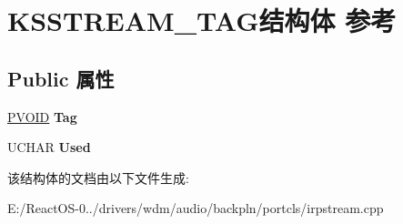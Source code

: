 \hypertarget{struct_k_s_s_t_r_e_a_m___t_a_g}{}\section{K\+S\+S\+T\+R\+E\+A\+M\+\_\+\+T\+A\+G结构体 参考}
\label{struct_k_s_s_t_r_e_a_m___t_a_g}
\subsection*{Public 属性}
\begin{DoxyCompactItemize}
\item 
\mbox{\label{struct_k_s_s_t_r_e_a_m___t_a_g_aec7a069a4837a6f257f948495398632e}} 
\hyperlink{interfacevoid}{P\+V\+O\+ID} {\bfseries Tag}
\item 
\mbox{\label{struct_k_s_s_t_r_e_a_m___t_a_g_ac47265ec7ccfed37a99b63a6e7d31327}} 
U\+C\+H\+AR {\bfseries Used}
\end{DoxyCompactItemize}


该结构体的文档由以下文件生成\+:\begin{DoxyCompactItemize}
\item 
E\+:/\+React\+O\+S-\/0../drivers/wdm/audio/backpln/portcls/irpstream.\+cpp\end{DoxyCompactItemize}
